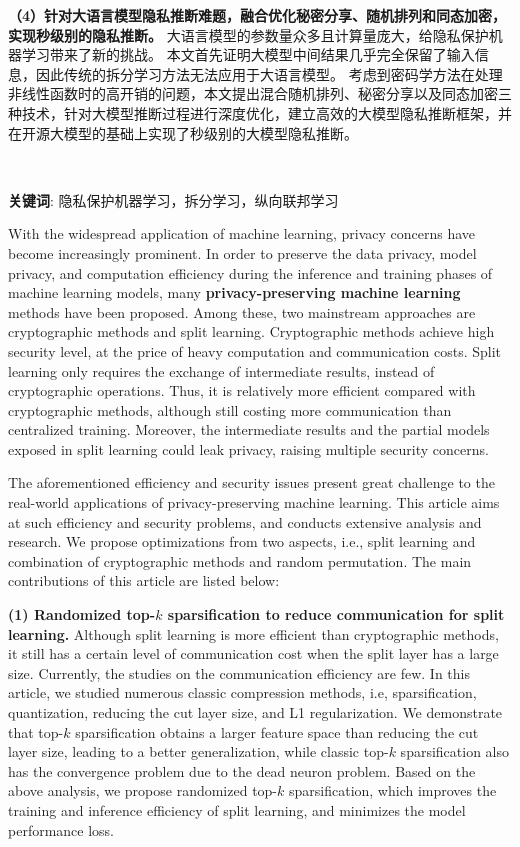 \textbf{（4）针对大语言模型隐私推断难题，融合优化秘密分享、随机排列和同态加密，实现秒级别的隐私推断。}
大语言模型的参数量众多且计算量庞大，给隐私保护机器学习带来了新的挑战。
本文首先证明大模型中间结果几乎完全保留了输入信息，因此传统的拆分学习方法无法应用于大语言模型。
考虑到密码学方法在处理非线性函数时的高开销的问题，本文提出混合随机排列、秘密分享以及同态加密三种技术，针对大模型推断过程进行深度优化，建立高效的大模型隐私推断框架，并在开源大模型的基础上实现了秒级别的大模型隐私推断。

~

\noindent \textbf{关键词}: 隐私保护机器学习，拆分学习，纵向联邦学习


\cleardoublepage
{}
With the widespread application of machine learning, privacy concerns have become increasingly prominent.
In order to preserve the data privacy, model privacy, and computation efficiency during the inference and training phases of machine learning models, many \textbf{privacy-preserving machine learning} methods have been proposed.
%
Among these, two mainstream approaches are cryptographic methods and split learning.
%
Cryptographic methods achieve high security level, at the price of heavy computation and communication costs.
%
Split learning only requires the exchange of intermediate results, instead of cryptographic operations.
Thus, it is relatively more efficient compared with cryptographic methods, although still costing more communication than centralized training.
Moreover, the intermediate results and the partial models exposed in split learning could leak privacy, raising multiple security concerns.

The aforementioned efficiency and security issues present great challenge to the real-world applications of privacy-preserving machine learning.
%
This article aims at such efficiency and security problems, and conducts extensive analysis and research.
%
We propose optimizations from two aspects, i.e., split learning and combination of cryptographic methods and random permutation.
%
The main contributions of this article are listed below:


\textbf{(1) Randomized top-$k$ sparsification to reduce communication for split learning.}
Although split learning is more efficient than cryptographic methods, it still has a certain level of communication cost when the split layer has a large size.
Currently, the studies on the communication efficiency are few.
%
In this article, we studied numerous classic compression methods, i.e, sparsification, quantization, reducing the cut layer size, and L1 regularization.
%
We demonstrate that top-$k$ sparsification obtains a larger feature space than reducing the cut layer size, leading to a better generalization, while classic top-$k$ sparsification also has the convergence problem due to the dead neuron problem.
%
Based on the above analysis, we propose randomized top-$k$ sparsification, which improves the training and inference efficiency of split learning, and minimizes the model performance loss.
%

